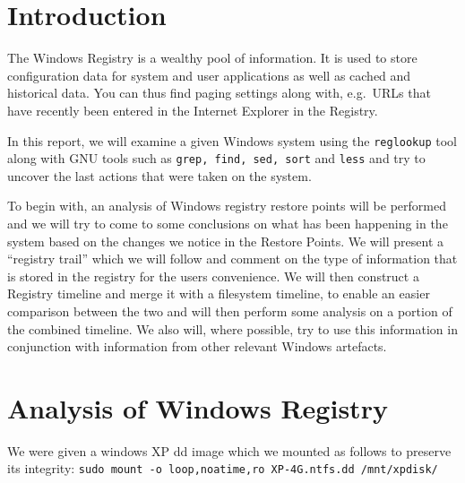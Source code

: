 \documentclass[a4paper,
    11pt,
    normalheadings,
    parindent,
    UKenglish,
    abstracton,
    ]{scrartcl}
\title{\mytitle{}}
\author{
    cand. Dipl. Inf. Tobias Müller <\href{mailto:muellet2@computing.dcu.ie?subject=ss10-forensic-lab01}{muellet2@}>, 59212333 \and
    BSc. Anthony Walters <\href{mailto:waltera3@computing.dcu.ie?subject=ss10-forensic-lab01}{waltera3@}>, 59213102
    }
\date{\today}
\begin{document}
\maketitle


\section{Introduction}
The Windows Registry is a wealthy pool of information.
It is used to store configuration data for system and user applications as well as cached and historical data.
You can thus find paging settings along with, e.g.\, URLs that have recently been entered in the Internet Explorer in the Registry.


In this report, we will examine a given Windows system using the \texttt{reglookup} tool along with GNU tools such as \texttt{grep, find, sed, sort} and \texttt{less} and try to uncover the last actions that were taken on the system.

To begin with, an analysis of Windows registry restore points will be performed and we will try to come to some conclusions on what has been happening  in the system based on the changes we notice in the Restore Points.
We will present a ``registry trail'' which we will follow and comment on the type of information that is stored in the registry for the users convenience.
We will then construct a Registry timeline and merge it with a filesystem timeline, to enable an easier comparison between the two and will then perform some analysis on a portion of the combined timeline.
We also will, where possible, try to use this information in conjunction with information from other relevant Windows artefacts.


\section{Analysis of Windows Registry}
We were given a windows XP dd image which we mounted as follows to preserve its integrity: \verb|sudo mount -o loop,noatime,ro XP-4G.ntfs.dd /mnt/xpdisk/|
\end{document}
